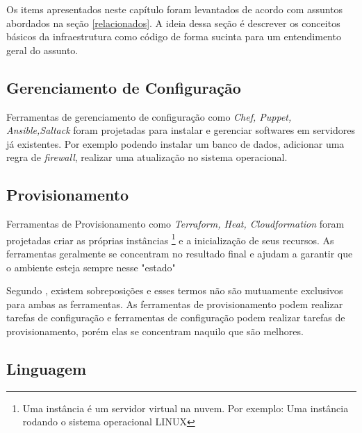 Os items apresentados neste capítulo foram levantados de acordo com assuntos abordados na seção \ref{relacionados}. A ideia dessa seção é descrever os conceitos básicos da infraestrutura como código de forma sucinta para um entendimento geral do assunto.  

\subsection{Gerenciamento de Configuração} 
Ferramentas de gerenciamento de configuração como \textit{Chef, Puppet, Ansible,Saltack} foram projetadas para instalar e gerenciar softwares em servidores já existentes. Por exemplo podendo instalar um banco de dados, adicionar uma regra de \textit{firewall}, realizar uma atualização no sistema operacional. 

\subsection{Provisionamento}

Ferramentas de Provisionamento como \textit{Terraform, Heat, Cloudformation} foram projetadas criar as próprias instâncias \footnote{Uma instância é um servidor virtual na nuvem. Por exemplo: Uma instância rodando o sistema operacional LINUX} e a inicialização de seus recursos. As ferramentas geralmente se concentram no resultado final e ajudam a garantir que o ambiente esteja sempre nesse "estado" 

Segundo , existem sobreposições e esses termos não são mutuamente exclusivos para ambas as ferramentas. As ferramentas de provisionamento podem realizar tarefas de configuração e ferramentas de configuração podem realizar tarefas de provisionamento, porém elas se concentram naquilo que são melhores. 


\subsection{Linguagem}

